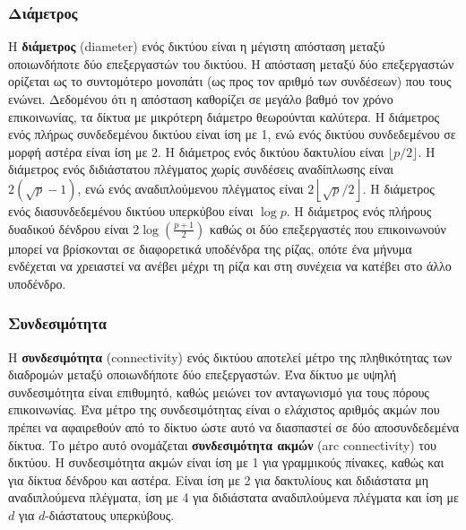 \documentclass[12pt,a4paper]{article}
\begin{document}
\subsubsection*{Διάμετρος}
Η \textbf{διάμετρος} (\foreignlanguage{english}{diameter}) ενός δικτύου 
είναι η μέγιστη απόσταση μεταξύ οποιωνδήποτε δύο επεξεργαστών του δικτύου. 
Η απόσταση μεταξύ δύο επεξεργαστών ορίζεται ως το συντομότερο μονοπάτι 
(ως προς τον αριθμό των συνδέσεων) που τους ενώνει. Δεδομένου ότι η 
απόσταση καθορίζει σε μεγάλο βαθμό τον χρόνο επικοινωνίας, τα δίκτυα
με μικρότερη διάμετρο θεωρούνται καλύτερα. Η διάμετρος ενός πλήρως 
συνδεδεμένου δικτύου είναι ίση με 1, ενώ ενός δικτύου συνδεδεμένου σε 
μορφή αστέρα είναι ίση με $2$. Η διάμετρος ενός δικτύου δακτυλίου είναι 
$\lfloor p/2 \rfloor$. Η διάμετρος ενός διδιάστατου πλέγματος χωρίς 
συνδέσεις αναδίπλωσης είναι $2(\sqrt{p}-1)$, ενώ ενός αναδιπλούμενου πλέγματος
είναι $2\left\lfloor \sqrt{p}/2 \right\rfloor$. Η διάμετρος ενός διασυνδεδεμένου 
δικτύου υπερκύβου είναι $\log p$. Η διάμετρος ενός πλήρους δυαδικού 
δένδρου είναι $2\log\!\left(\frac{p+1}{2}\right)$ καθώς οι δύο 
επεξεργαστές που επικοινωνούν μπορεί να βρίσκονται σε διαφορετικά 
υποδένδρα της ρίζας, οπότε ένα μήνυμα ενδέχεται να χρειαστεί να ανέβει 
μέχρι τη ρίζα και στη συνέχεια να κατέβει στο άλλο υποδένδρο.

\subsubsection*{Συνδεσιμότητα}
Η \textbf{συνδεσιμότητα} (\foreignlanguage{english}{connectivity}) ενός 
δικτύου αποτελεί μέτρο της πληθικότητας των διαδρομών μεταξύ οποιωνδήποτε 
δύο επεξεργαστών. Ένα δίκτυο με υψηλή συνδεσιμότητα είναι επιθυμητό, 
καθώς μειώνει τον ανταγωνισμό για τους πόρους επικοινωνίας. Ένα μέτρο της 
συνδεσιμότητας είναι ο ελάχιστος αριθμός ακμών που πρέπει να αφαιρεθούν 
από το δίκτυο ώστε αυτό να διασπαστεί σε δύο αποσυνδεδεμένα δίκτυα. Το 
μέτρο αυτό ονομάζεται \textbf{συνδεσιμότητα ακμών} (\foreignlanguage{english}{arc connectivity}) 
του δικτύου. Η συνδεσιμότητα ακμών είναι ίση με 1 για γραμμικούς πίνακες, 
καθώς και για δίκτυα δένδρου και αστέρα. Είναι ίση με 2 για δακτυλίους
και διδιάστατα μη αναδιπλούμενα πλέγματα, ίση με 4 για διδιάστατα αναδιπλούμενα 
πλέγματα και ίση με $d$ για $d$-διάστατους υπερκύβους.
\end{document}
